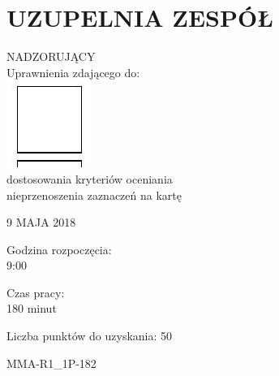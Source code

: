 \documentclass[10pt]{article}
\begin{document}
\section*{UZUPELNIA ZESPÓŁ}
NADZORUJĄCY\\
Uprawnienia zdającego do:\\
\includegraphics[max width=\textwidth, center]{2024_11_21_7379bf55d75dd0fc4c58g-01(1)}\\
dostosowania kryteriów oceniania\\
nieprzenoszenia zaznaczeń na kartę

9 MAJA 2018

Godzina rozpoczęcia:\\
9:00

Czas pracy:\\
180 minut

Liczba punktów do uzyskania: 50

MMA-R1\_1P-182
\end{document}
